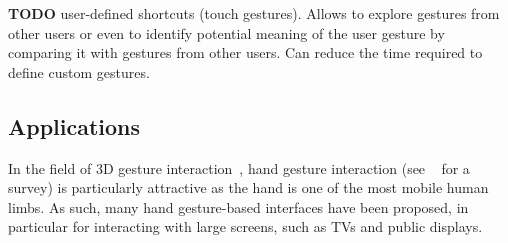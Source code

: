 \textbf{TODO} %
%
\cite{Ouyang:2012} user-defined shortcuts (touch gestures). Allows to explore gestures from other users or even to identify potential meaning of the user gesture by comparing it with gestures from other users. Can reduce the time required to define custom gestures.
%
\cite{Xu:2022}




\subsection{Applications} \label{sec:state_of_the_art:overview:applications}
In the field of 3D gesture interaction~\cite{LaViola:2013,Koutsabasis:2019}, hand gesture interaction (see ~\cite{Cheng:2016} for a survey) is particularly attractive as the hand is one of the most mobile human limbs. As such, many hand gesture-based interfaces have been proposed, in particular for interacting with large screens, such as TVs and public displays.

